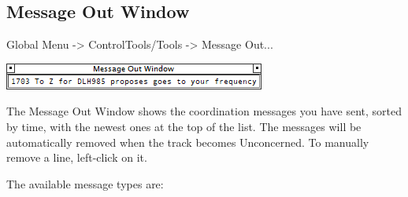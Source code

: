 \documentclass[11pt,a4paper,oldfontcommands]{memoir}
\begin{document}
\subsection{Message Out Window}
\label{win:mow}

Global Menu -> ControlTools/Tools -> Message Out...

\includegraphics{img/mow.png}

The Message Out Window shows the coordination messages you have sent, sorted by time, with the newest ones at the top of the list. The messages will be automatically removed when the track becomes Unconcerned. To manually remove a line, left-click on it.

The available message types are:
\end{document}
